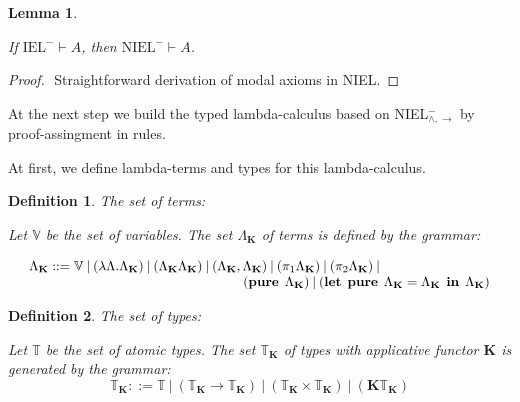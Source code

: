 \documentclass[a4paper]{article}
\newtheorem{lemma}{Lemma}
\newtheorem{defin}{Definition}
\begin{document}
  \begin{lemma}
    $ $

    If $\text{IEL}^{-} \vdash A$, then $\text{NIEL}^{-} \vdash A$.
  \end{lemma}

  \begin{proof}
    $ $
    Straightforward derivation of modal axioms in NIEL.
  \end{proof}

  \vspace{\baselineskip}

  At the next step we build the typed lambda-calculus based on NIEL$^{-}_{\land, \to}$ by proof-assingment in
  rules.

  At first, we define lambda-terms and types for this lambda-calculus.

  \vspace{\baselineskip}

  \begin{defin} The set of terms:

  Let $\mathbb{V}$ be the set of variables. The set $\Lambda_{\textbf{K}}$ of terms is defined by the grammar:

$\begin{array}{lll}
& \Lambda_{\textbf{K}} ::= \mathbb{V} \: | \:  (\lambda \Lambda.\Lambda_{\textbf{K}}) \: | \: (\Lambda_{\textbf{K}}\Lambda_{\textbf{K}}) \: | \: (\Lambda_{\textbf{K}} , \Lambda_{\textbf{K}}) \: | \: (\pi_1 \Lambda_{\textbf{K}}) \: | \: (\pi_2 \Lambda_{\textbf{K}}) \: | & \\
& \quad\quad\quad\quad\quad\quad\quad\quad\quad\quad\quad\quad\quad\quad\quad\quad ({\bf pure \: } \: \Lambda_{\textbf{K}}) \: | \: ({\bf let \:\: pure} \:\: \Lambda_{\textbf{K}} = \Lambda_{\textbf{K}} \:\: {\bf in} \:\: \Lambda_{\textbf{K}})
\end{array}$

  \end{defin}

  \begin{defin} The set of types:

  Let $\mathbb{T}$ be the set of atomic types. The set $\mathbb{T}_{\textbf{K}}$ of types with applicative
  functor
  $\textbf{K}$ is generated by the grammar:
  \begin{equation}
    \mathbb{T}_{\textbf{K}} ::= \mathbb{T} \: | \: (\mathbb{T}_{\textbf{K}} \to \mathbb{T}_{\textbf{K}}) \: |
    \:
    (\mathbb{T}_{\textbf{K}} \times \mathbb{T}_{\textbf{K}}) \: | \: (\textbf{K}\mathbb{T}_{\textbf{K}})
  \end{equation}
  \end{defin}
\end{document}
